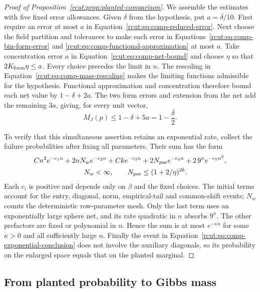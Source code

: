\begin{proof}[Proof of Proposition~\ref{rcut:prop:planted-comparison}]
 We assemble the estimates with five fixed error allowances.  Given
 $\delta$ from the hypothesis, put $a=\delta/10$.  First require an
 error at most $a$ in Equation~\eqref{rcut:eq:comp-reduced-error}.
 Next choose the field partition and tolerances to make each error
 in Equations~\eqref{rcut:eq:comp-bin-form-error} and
 \eqref{rcut:eq:comp-functional-approximation} at most $a$.
 Take concentration error $a$ in Equation~\eqref{rcut:eq:comp-net-bound}
 and choose $\eta$ so that $2K_{\rm form}\eta\le a$.
 Every choice precedes the limit in $n$.
 The rescaling in Equation~\eqref{rcut:eq:comp-mass-rescaling} makes
 the limiting functions admissible for the hypothesis.  Functional
 approximation and concentration therefore bound each net value by
 $1-\delta+2a$.  The two form errors and extension from the net add
 the remaining $3a$, giving, for every unit vector,
 \[
  M_J(p)\le1-\delta+5a=1-\frac\delta2.
 \]

 To verify that this simultaneous assertion retains an exponential
 rate, collect the failure probabilities after fixing all parameters.
 Their sum has the form
 \begin{align*}
  &C n^2e^{-c_1n}+2nN_we^{-c_2n}
      +Ck e^{-c_3n}+2N_{\rm par}e^{-c_4n}
      +2\,9^ne^{-c_5n^2},\\
  &\hspace{25mm}N_w<\infty,\qquad
      N_{\rm par}\le(1+2/\eta)^{2k}.
 \end{align*}
 Each $c_i$ is positive and depends only on $\beta$ and the fixed
 choices.  The initial terms account for the entry, diagonal, norm,
 empirical-tail and common-shift events; $N_w$ counts the deterministic
 row-parameter mesh.  Only the last term uses an exponentially large
 sphere net, and its rate quadratic in $n$ absorbs $9^n$.  The other
 prefactors are fixed or polynomial in $n$.  Hence the sum is at most
 $e^{-\kappa n}$ for some $\kappa>0$ and all sufficiently large $n$.
 Finally the event in Equation~\eqref{rcut:eq:comp-exponential-conclusion}
 does not involve the auxiliary diagonals, so its probability on the
 enlarged space equals that on the planted marginal.
\end{proof}

\subsection{From planted probability to Gibbs mass}

